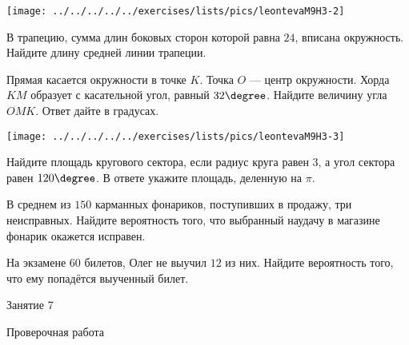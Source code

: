 \begin{homework}[number=3]
\begin{listofex}
	 	\hspace{0.02\linewidth}
	 	\begin{minipage}[t]{\picwidth}
			\texttt{[image: ../../../../../exercises/lists/pics/leontevaM9H3-2]}
	 	\end{minipage}
		\item В трапецию, сумма длин боковых сторон которой равна \( 24 \), вписана окружность. Найдите длину средней линии трапеции.
		\item 
		\begin{minipage}[t]{\bodywidth}
			Прямая касается окружности в точке \( K \). Точка \( O \)  --- центр окружности. Хорда \( KM \) образует с касательной угол, равный \( 32\degree \). Найдите величину угла \( OMK \). Ответ дайте в градусах.
		\end{minipage}
		\hspace{0.02\linewidth}
		\begin{minipage}[t]{\picwidth}
				\texttt{[image: ../../../../../exercises/lists/pics/leontevaM9H3-3]}
		\end{minipage}
		\item Найдите площадь кругового сектора, если радиус круга равен \( 3 \), а угол сектора равен \( 120\degree \). В ответе укажите площадь, деленную на \( \pi \).
		\item В среднем из \( 150 \) карманных фонариков, поступивших в продажу,
		три неисправных. Найдите вероятность того, что выбранный наудачу
		в магазине фонарик окажется исправен.
		\item На экзамене \( 60 \) билетов, Олег не выучил \( 12 \) из них. Найдите вероятность того, что ему попадётся выученный билет.
	\end{listofex}
\end{homework}

\begin{class}[number=7]
	\begin{listofex}
		\item Занятие 7
	\end{listofex}
\end{class}

\begin{exam}
	\begin{listofex}
		 \item Проверочная работа
	\end{listofex}
\end{exam}
